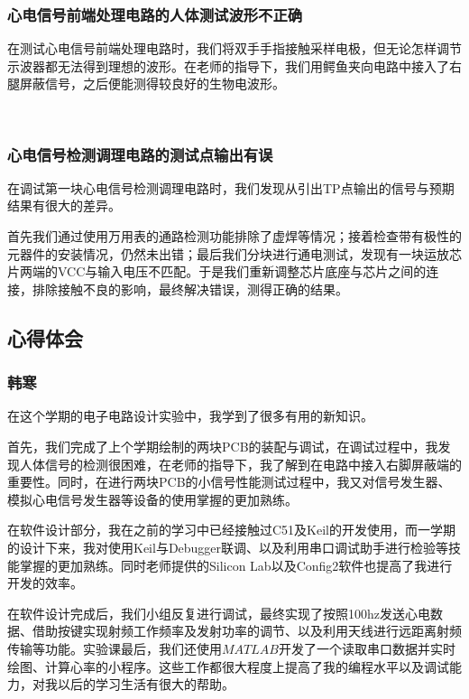 \documentclass{zjureport}
\begin{document}
	\subsubsection{心电信号前端处理电路的人体测试波形不正确}
	
	在测试心电信号前端处理电路时，我们将双手手指接触采样电极，但无论怎样调节示波器都无法得到理想的波形。在老师的指导下，我们用鳄鱼夹向电路中接入了右腿屏蔽信号，之后便能测得较良好的生物电波形。
	
	~\\
	
	\subsubsection{心电信号检测调理电路的测试点输出有误}
	
	在调试第一块心电信号检测调理电路时，我们发现从引出TP点输出的信号与预期结果有很大的差异。
	
	首先我们通过使用万用表的通路检测功能排除了虚焊等情况；接着检查带有极性的元器件的安装情况，仍然未出错；最后我们分块进行通电测试，发现有一块运放芯片两端的VCC与输入电压不匹配。于是我们重新调整芯片底座与芯片之间的连接，排除接触不良的影响，最终解决错误，测得正确的结果。
	
	\newpage
	
	\subsection{心得体会}
	
	\subsubsection{韩寒}
	
	在这个学期的电子电路设计实验中，我学到了很多有用的新知识。
	
	首先，我们完成了上个学期绘制的两块PCB的装配与调试，在调试过程中，我发现人体信号的检测很困难，在老师的指导下，我了解到在电路中接入右脚屏蔽端的重要性。同时，在进行两块PCB的小信号性能测试过程中，我又对信号发生器、模拟心电信号发生器等设备的使用掌握的更加熟练。
	
	在软件设计部分，我在之前的学习中已经接触过C51及Keil的开发使用，而一学期的设计下来，我对使用Keil与Debugger联调、以及利用串口调试助手进行检验等技能掌握的更加熟练。同时老师提供的Silicon Lab以及Config2软件也提高了我进行开发的效率。
	
	在软件设计完成后，我们小组反复进行调试，最终实现了按照100hz发送心电数据、借助按键实现射频工作频率及发射功率的调节、以及利用天线进行远距离射频传输等功能。实验课最后，我们还使用$MATLAB$开发了一个读取串口数据并实时绘图、计算心率的小程序。这些工作都很大程度上提高了我的编程水平以及调试能力，对我以后的学习生活有很大的帮助。
	
\end{document}

